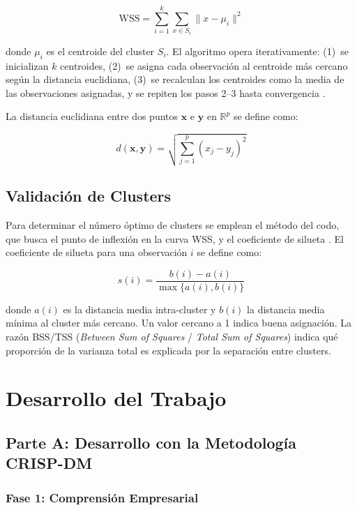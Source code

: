 \documentclass[10pt,a4paper]{article}
\begin{document}
\begin{equation}
  \text{WSS} = \sum_{i=1}^{k} \sum_{x \in S_i} \|x - \mu_i\|^2
\end{equation}

donde $\mu_i$ es el centroide del cluster $S_i$. El algoritmo opera iterativamente: (1)~se inicializan $k$ centroides, (2)~se asigna cada observación al centroide más cercano según la distancia euclidiana, (3)~se recalculan los centroides como la media de las observaciones asignadas, y se repiten los pasos 2--3 hasta convergencia \parencite{hastie2009}.

La distancia euclidiana entre dos puntos $\mathbf{x}$ e $\mathbf{y}$ en $\mathbb{R}^p$ se define como:

\begin{equation}
  d(\mathbf{x}, \mathbf{y}) = \sqrt{\sum_{j=1}^{p}(x_j - y_j)^2}
\end{equation}

\subsection{Validación de Clusters}

Para determinar el número óptimo de clusters se emplean el método del codo, que busca el punto de inflexión en la curva WSS, y el coeficiente de silueta \parencite{rousseeuw1987}. El coeficiente de silueta para una observación $i$ se define como:

\begin{equation}
  s(i) = \frac{b(i) - a(i)}{\max\{a(i), b(i)\}}
\end{equation}

donde $a(i)$ es la distancia media intra-cluster y $b(i)$ la distancia media mínima al cluster más cercano. Un valor cercano a 1 indica buena asignación. La razón BSS/TSS (\textit{Between Sum of Squares} / \textit{Total Sum of Squares}) indica qué proporción de la varianza total es explicada por la separación entre clusters.

\section{Desarrollo del Trabajo}
\subsection{Parte A: Desarrollo con la Metodología CRISP-DM}
\subsubsection{Fase 1: Comprensión Empresarial}
\end{document}
